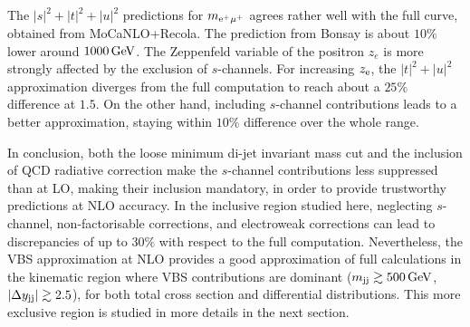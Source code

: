 %
The $|s|^2+|t|^2+|u|^2$ predictions for $m_{\rm e^+\mu^+}$ agrees rather well with the full curve, obtained from {\sc MoCa\-NLO+Recola}.
The prediction from {\sc Bonsay} is about $10\%$ lower around $1000 \,\text{GeV}$.
The Zeppenfeld variable of the positron $z_e$ is more strongly affected by the exclusion of $s$-channels.
For increasing $z_{\rm e}$, the $|t|^2+|u|^2$ approximation diverges from the full computation to reach about a $25\%$ difference  at $1.5$.
On the other hand, including $s$-channel contributions leads to a better approximation, staying within $10\%$ difference over the whole range.

In conclusion, both the loose minimum di-jet invariant mass cut and the inclusion of QCD radiative correction make the $s$-channel contributions less suppressed than at LO, making their inclusion mandatory, in order to provide trustworthy predictions at NLO accuracy.
In the inclusive region studied here, neglecting $s$-channel, non-factorisable corrections, and electroweak corrections can lead to discrepancies of up to $30\%$ with respect to the full computation.
Nevertheless, the VBS approximation at NLO provides a good approximation of full calculations in the kinematic region where VBS contributions are dominant ($m_{\text{j}\text{j}} \gtrsim 500 \,\text{GeV}$, $|\Delta y_{\text{j}\text{j}}| \gtrsim 2.5$), for both total cross section and differential distributions.
This more exclusive region is studied in more details in the next section.

